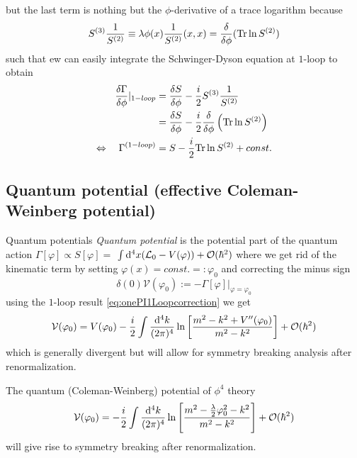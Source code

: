 but the last term is nothing but the $\phi$-derivative of a trace logarithm because
\begin{equation*}
	S^{(3)} \frac{1}{S^{(2)}} \equiv \lambda \phi(x) \frac{1}{S^{(2)}}(x,x) = \frac{\delta}{\delta \phi} (\mathrm{Tr} \ln S^{(2)})
\end{equation*}
such that ew can easily integrate the Schwinger-Dyson equation at $1$-loop to obtain
\begin{align*}
	\frac{\delta \Gamma}{\delta \phi}|_{1-loop} &= \frac{\delta S}{\delta \phi} - \frac{i}{2} S^{(3)} \frac{1}{S^{(2)}}\\
	&= \frac{\delta S}{\delta \phi} - \frac{i}{2} \frac{\delta}{\delta \phi}\left(\mathrm{Tr} \ln S^{(2)}\right)\\
	\Leftrightarrow\quad \Gamma^{(1-loop)} &= S - \frac{i}{2} \mathrm{Tr} \ln S^{(2)} + const.
\end{align*}

\subsection{Quantum potential (effective Coleman-Weinberg potential)}
\begin{mybox}{Quantum potentials}
	\emph{Quantum potential} is the potential part of the quantum action $\Gamma[\varphi] \propto S[\varphi] =$ $\int \mathrm{d}^4 x (\mathcal{L}_0-V(\varphi)) + \mathcal{O}(\hbar^2)$ where we get rid of the kinematic term by setting $\varphi(x)=const.=:\varphi_0$ and correcting the minus sign
	\begin{equation}
	\delta(0) \mathcal{V}(\varphi_0) := -\Gamma[\varphi]|_{\varphi=\varphi_0}
	\end{equation}
	using the $1$-loop result \ref{eq:onePI1Loopcorrection} we get
	\begin{equation}
	\mathcal{V}(\varphi_0) = V(\varphi_0) - \frac{i}{2} \int \frac{\mathrm{d}^4 k}{(2 \pi)^4}\ln\left[\frac{m^2-k^2+V^{\prime \prime}(\varphi_0)}{m^2-k^2}\right]+\mathcal{O}(\hbar^2)
	\end{equation}
	which is generally divergent but will allow for symmetry breaking analysis after renormalization.
\end{mybox}
The quantum (Coleman-Weinberg) potential of $\phi^4$ theory 
\begin{equation}
	\label{eq:colemanweinbergPotential}
	\mathcal{V}(\varphi_0) = -\frac{i}{2} \int \frac{\mathrm{d}^4 k}{(2 \pi)^4} \ln \left[\frac{m^2-\frac{\lambda}{2} \varphi^2_0-k^2}{m^2-k^2}\right] + \mathcal{O}(\hbar^2)
\end{equation}
will give rise to symmetry breaking after renormalization.



